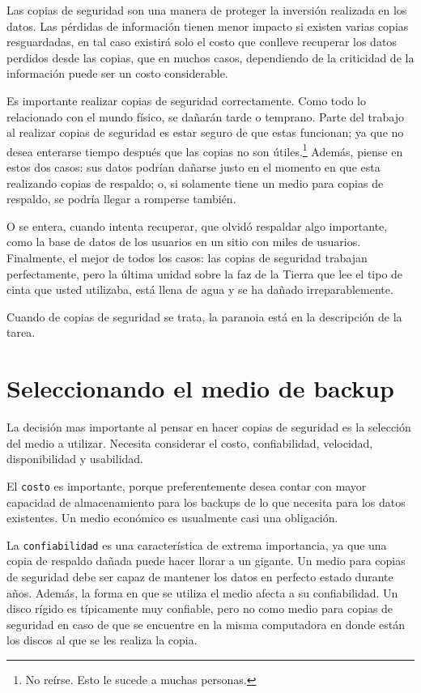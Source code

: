 ﻿\documentclass[12pt]{article}
\begin{document}
Las copias de seguridad son una manera de proteger la inversión realizada 
en los datos. Las pérdidas de información tienen menor impacto si existen 
varias copias resguardadas, en tal caso existirá solo el costo que conlleve
recuperar los datos perdidos desde las copias, que en muchos casos, 
dependiendo de la criticidad de la información puede ser un costo 
considerable. 

Es importante realizar copias de seguridad correctamente. Como todo lo 
relacionado con el mundo físico, se dañarán tarde o temprano. Parte del
trabajo al realizar copias de seguridad es estar seguro de que estas 
funcionan; ya que no desea enterarse tiempo después que las copias no son 
útiles.\footnote{No reírse. Esto le sucede a muchas personas.} Además,
 piense en estos dos casos: sus datos podrían dañarse justo en el momento 
en que esta realizando copias de respaldo; o, si solamente tiene un medio 
para copias de respaldo, se podría llegar a romperse también. 

O se entera, cuando intenta recuperar, que olvidó respaldar algo importante,
como la base de datos de los usuarios en un sitio con miles de usuarios. 
Finalmente, el mejor de todos los casos: las copias de seguridad trabajan 
perfectamente, pero la última unidad sobre la faz de la Tierra que lee el 
tipo de cinta que usted utilizaba, está llena de agua y se ha dañado 
irreparablemente.

Cuando de copias de seguridad se trata, la paranoia está en la descripción 
de la tarea.

\section{ Seleccionando el medio de backup}

La decisión mas importante al pensar en hacer copias de seguridad es la 
selección del medio a utilizar. Necesita considerar el costo, 
confiabilidad, velocidad, disponibilidad y usabilidad.

El \texttt{costo} es importante, porque preferentemente desea contar con 
mayor 
capacidad de almacenamiento para los backups de lo que necesita para los 
datos existentes. Un medio económico es usualmente casi una obligación.

La \texttt{confiabilidad} es una característica de extrema importancia, 
ya que una 
copia de respaldo dañada puede hacer llorar a un gigante. Un medio para 
copias de seguridad debe ser capaz de mantener los datos en perfecto 
estado durante años. Además, la forma en que se utiliza el medio afecta 
a su confiabilidad. Un disco rígido es típicamente muy confiable, pero 
no como medio para copias de seguridad en caso de que se encuentre en 
la misma computadora en donde están los discos al que se les realiza la 
copia.
\end{document}
